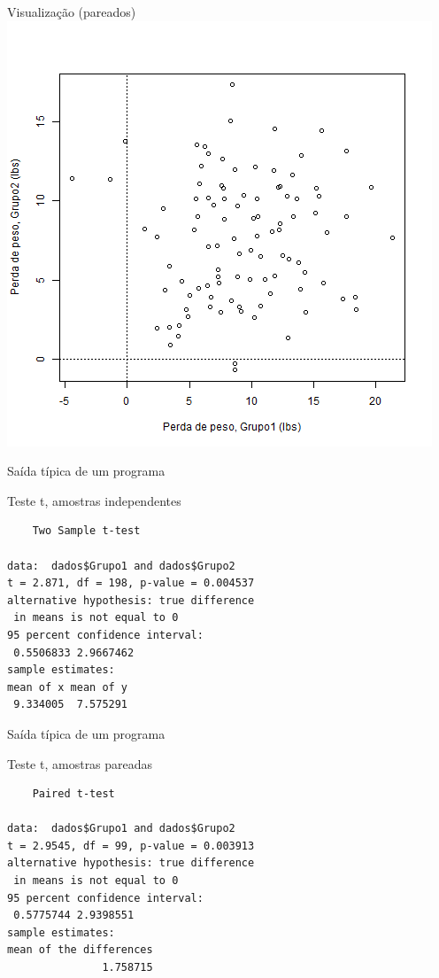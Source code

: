 \documentclass{beamer}
\begin{document}
\begin{frame}{Visualização (pareados)}
    \includegraphics[height=\textheight]{Cap23-25/2-amostras-pareadas}
  \end{frame}


\begin{frame}[fragile]{Saída típica de um programa}
  \begin{block}{Teste t, amostras independentes}
    \begin{verbatim}
	Two Sample t-test

data:  dados$Grupo1 and dados$Grupo2
t = 2.871, df = 198, p-value = 0.004537
alternative hypothesis: true difference 
 in means is not equal to 0
95 percent confidence interval:
 0.5506833 2.9667462
sample estimates:
mean of x mean of y 
 9.334005  7.575291
    \end{verbatim}
  \end{block}
\end{frame}

\begin{frame}[fragile]{Saída típica de um programa}
  \begin{block}{Teste t, amostras pareadas}
    \begin{verbatim}
	Paired t-test

data:  dados$Grupo1 and dados$Grupo2
t = 2.9545, df = 99, p-value = 0.003913
alternative hypothesis: true difference 
 in means is not equal to 0
95 percent confidence interval:
 0.5775744 2.9398551
sample estimates:
mean of the differences 
               1.758715
    \end{verbatim}
  \end{block}
\end{frame}
\end{document}
